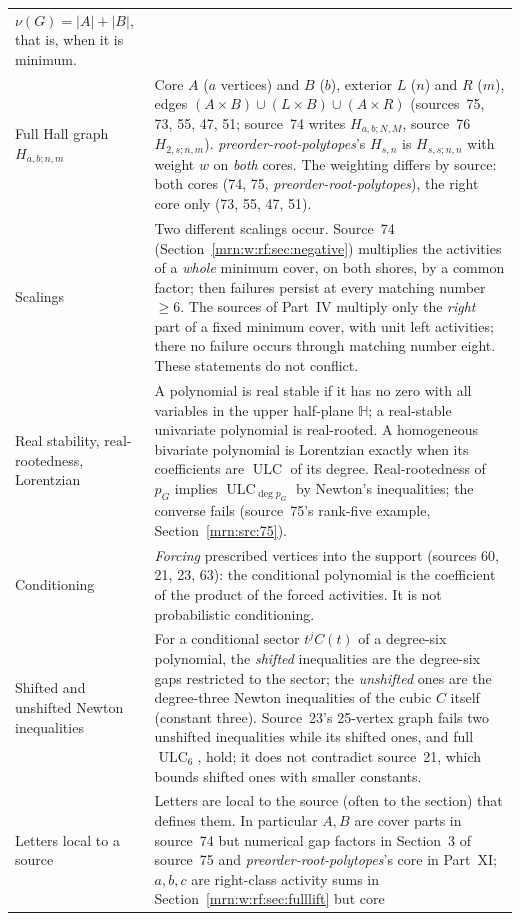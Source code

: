 \documentclass[11pt,a4paper]{article}
\theoremstyle{remark}\newtheorem{remark}[theorem]{Remark}
\newcommand{\ULC}{\operatorname{ULC}}      %
\newcommand{\HH}{\mathbb H}                %
\newcommand{\prp}{\emph{preorder-root-polytopes}}
\begin{document}
\begin{longtable}{>{\raggedright\arraybackslash}p{}>{\raggedright\arraybackslash}p{}}
$\nu(G)=|A|+|B|$, that is, when it is minimum.\\
Full Hall graph $H_{a,b;n,m}$ &
Core $A$ ($a$ vertices) and $B$ ($b$), exterior $L$ ($n$) and $R$ ($m$),
edges $(A\times B)\cup(L\times B)\cup(A\times R)$ (sources~75, 73, 55, 47,
51; source~74 writes $H_{a,b;N,M}$, source~76 $H_{2,s;n,m}$). \prp's
$H_{s,n}$ is $H_{s,s;n,n}$ with weight $w$ on \emph{both} cores. The
weighting differs by source: both cores (74, 75, \prp), the right core only
(73, 55, 47, 51).\\
Scalings &
Two different scalings occur. Source~74 (Section~\ref{mrn:w:rf:sec:negative})
multiplies the activities of a \emph{whole} minimum cover, on both shores,
by a common factor; then failures persist at every matching number $\ge6$.
The sources of Part~IV multiply only the \emph{right} part of a fixed
minimum cover, with unit left activities; there no failure occurs through
matching number eight. These statements do not conflict.\\
Real stability, real-rootedness, Lorentzian &
A polynomial is real stable if it has no zero with all variables in the
upper half-plane $\HH$; a real-stable univariate polynomial is real-rooted.
A homogeneous bivariate polynomial is Lorentzian exactly when its
coefficients are $\ULC$ of its degree. Real-rootedness of $p_G$ implies
$\ULC_{\deg p_G}$ by Newton's inequalities; the converse fails
(source~75's rank-five example, Section~\ref{mrn:src:75}).\\
Conditioning &
\emph{Forcing} prescribed vertices into the support (sources 60, 21, 23,
63): the conditional polynomial is the coefficient of the product of the
forced activities. It is not probabilistic conditioning.\\
Shifted and unshifted Newton inequalities &
For a conditional sector $t^jC(t)$ of a degree-six polynomial, the
\emph{shifted} inequalities are the degree-six gaps restricted to the
sector; the \emph{unshifted} ones are the degree-three Newton inequalities
of the cubic $C$ itself (constant three). Source~23's 25-vertex graph
fails two unshifted inequalities while its shifted ones, and full $\ULC_6$,
hold; it does not contradict source~21, which bounds shifted ones with
smaller constants.\\
Letters local to a source &
Letters are local to the source (often to the section) that defines them.
In particular $A,B$ are cover parts in source~74 but numerical gap factors
in Section~3 of source~75 and \prp's core in Part~XI; $a,b,c$ are
right-class activity sums in Section~\ref{mrn:w:rf:sec:fulllift} but core

\end{longtable}
\end{document}
